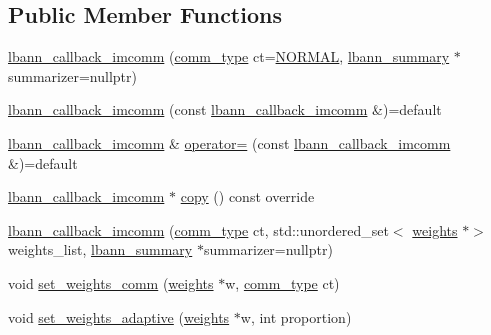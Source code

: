 \subsection*{Public Member Functions}
\begin{DoxyCompactItemize}
\item 
\hyperlink{classlbann_1_1lbann__callback__imcomm_a06dc9efdcd77c9e1cf714ecf709a6e3a}{lbann\+\_\+callback\+\_\+imcomm} (\hyperlink{classlbann_1_1lbann__callback__imcomm_acf7e894b3381e7f9b71020dc73594d6a}{comm\+\_\+type} ct=\hyperlink{classlbann_1_1lbann__callback__imcomm_acf7e894b3381e7f9b71020dc73594d6aa5f19efb5bef79cea24be992a2137962e}{N\+O\+R\+M\+AL}, \hyperlink{classlbann_1_1lbann__summary}{lbann\+\_\+summary} $\ast$summarizer=nullptr)
\item 
\hyperlink{classlbann_1_1lbann__callback__imcomm_a95ae70dd6a90c023ee3bd0638dc24888}{lbann\+\_\+callback\+\_\+imcomm} (const \hyperlink{classlbann_1_1lbann__callback__imcomm}{lbann\+\_\+callback\+\_\+imcomm} \&)=default
\item 
\hyperlink{classlbann_1_1lbann__callback__imcomm}{lbann\+\_\+callback\+\_\+imcomm} \& \hyperlink{classlbann_1_1lbann__callback__imcomm_a01ee7aaa808987e1f7fcca0e85cc1f73}{operator=} (const \hyperlink{classlbann_1_1lbann__callback__imcomm}{lbann\+\_\+callback\+\_\+imcomm} \&)=default
\item 
\hyperlink{classlbann_1_1lbann__callback__imcomm}{lbann\+\_\+callback\+\_\+imcomm} $\ast$ \hyperlink{classlbann_1_1lbann__callback__imcomm_a9d59535b4789389a8c3c9e406cd1e2d3}{copy} () const override
\item 
\hyperlink{classlbann_1_1lbann__callback__imcomm_aadc785d2f27ad0b03fce8c2785cff4fb}{lbann\+\_\+callback\+\_\+imcomm} (\hyperlink{classlbann_1_1lbann__callback__imcomm_acf7e894b3381e7f9b71020dc73594d6a}{comm\+\_\+type} ct, std\+::unordered\+\_\+set$<$ \hyperlink{classlbann_1_1weights}{weights} $\ast$$>$ weights\+\_\+list, \hyperlink{classlbann_1_1lbann__summary}{lbann\+\_\+summary} $\ast$summarizer=nullptr)
\item 
void \hyperlink{classlbann_1_1lbann__callback__imcomm_a6ad492f30a34de2ac62fe459037e1d12}{set\+\_\+weights\+\_\+comm} (\hyperlink{classlbann_1_1weights}{weights} $\ast$w, \hyperlink{classlbann_1_1lbann__callback__imcomm_acf7e894b3381e7f9b71020dc73594d6a}{comm\+\_\+type} ct)
\item 
void \hyperlink{classlbann_1_1lbann__callback__imcomm_a5e0f7d9f85da8d2e579dbe4092bc3100}{set\+\_\+weights\+\_\+adaptive} (\hyperlink{classlbann_1_1weights}{weights} $\ast$w, int proportion)
$$
\end{DoxyCompactItemize}

